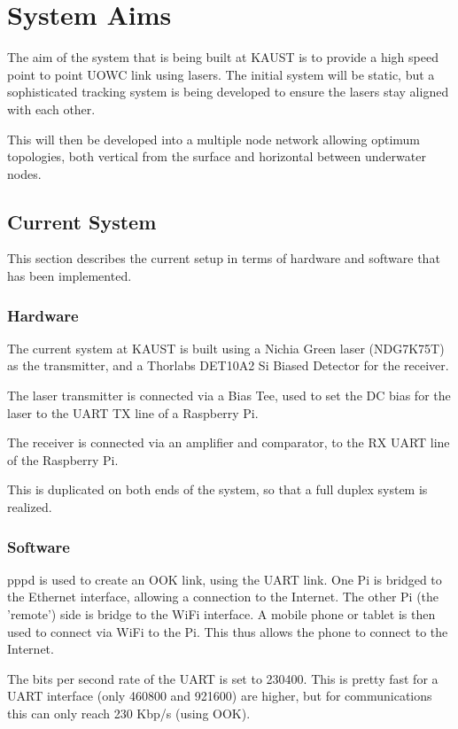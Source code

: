 \section{System Aims}
The aim of the system that is being built at \ac{KAUST} is to provide a high
speed point to point \ac{UOWC} link using lasers. The initial system will be
static, but a sophisticated tracking system is being developed to ensure the
lasers stay aligned with each other.

This will then be developed into a multiple node network allowing optimum
topologies, both vertical from the surface and horizontal between underwater
nodes.

\subsection{Current System}
This section describes the current setup in terms of hardware and software
that has been implemented.

\subsubsection{Hardware}
The current system at \ac{KAUST} is built using a Nichia Green laser (NDG7K75T)
as the transmitter, and a Thorlabs DET10A2 Si Biased Detector for the receiver.

The laser transmitter is connected via a Bias Tee, used to set the DC bias
for the laser to the \ac{UART} TX line of a Raspberry Pi.

The receiver is connected via an amplifier and comparator, to the RX UART
line of the Raspberry Pi.

This is duplicated on both ends of the system, so that a full duplex
system is realized.

\subsubsection{Software}
pppd is used to create an OOK link, using the \ac{UART} link. One Pi is
bridged to the Ethernet interface, allowing a connection to the Internet.
The other Pi (the 'remote') side is bridge to the WiFi interface. A mobile
phone or tablet is then used to connect via WiFi to the Pi. This thus allows
the phone to connect to the Internet.

The bits per second rate of the \ac{UART} is set to 230400. This is pretty fast
for a \ac{UART} interface (only 460800 and 921600) are higher, but for
communications this can only reach 230 Kbp/s (using \ac{OOK}).

